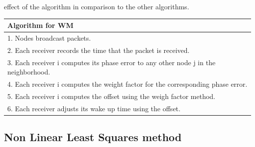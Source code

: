 \documentclass[a4paper,10pt]{report}
\begin{document}
effect of the algorithm in comparison to the other algorithms.\newline \newline
\begin{tabular}{  l }Algorithm for WM \\\hline
1. Nodes broadcast packets. \\  2. Each receiver records the time that the packet is received. \\
3. Each receiver i computes its phase error to any other node j in the neighborhood. \\
4. Each receiver i computes the weight factor for the corresponding phase error. \\
5. Each receiver i computes the offset using the weigh factor method. \\
6. Each receiver adjusts its wake up time using the offset.\\
\hline
\end{tabular}
\subsection{\textbf{Non Linear Least Squares method}}
\end{document}
